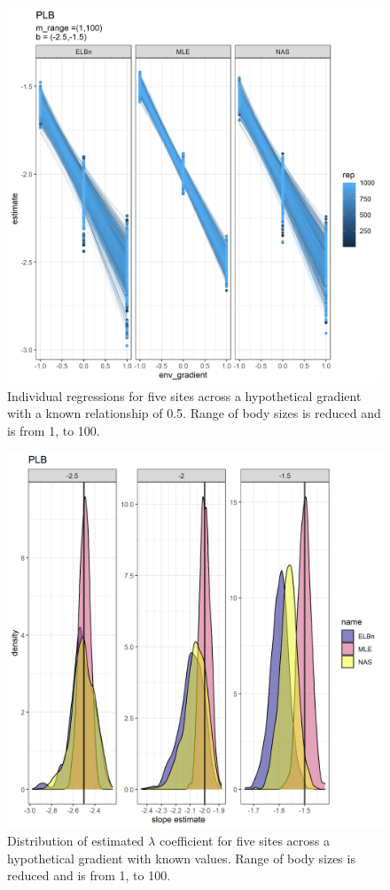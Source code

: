 \documentclass[
]{article}
\begin{document}
\begin{figure}
\centering
\includegraphics{figures/PLB_small_m_main.png}
\caption{Individual regressions for five sites across a hypothetical
gradient with a known relationship of 0.5. Range of body sizes is
reduced and is from 1, to 100.}
\end{figure}

\begin{figure}
\centering
\includegraphics{figures/PLB_small_m_est_b_density.png}
\caption{Distribution of estimated \(\lambda\) coefficient for five
sites across a hypothetical gradient with known values. Range of body
sizes is reduced and is from 1, to 100.}
\end{figure}
\end{document}
